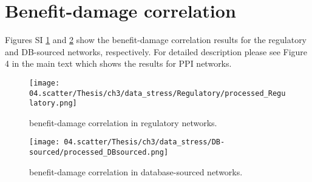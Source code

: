 

\newpage
\section{Benefit-damage correlation}\label{sup_extra_BD_corr}
    Figures SI \ref{fig_data_stress_Regulatory} and \ref{fig_data_stress_DBs} show the benefit-damage correlation results for the regulatory and DB-sourced networks, respectively. For detailed description please see Figure 4 in the main text which shows the results for PPI networks.

    \begin{figure}[H]%
        \texttt{[image: 04.scatter/Thesis/ch3/data\_stress/Regulatory/processed\_Regulatory.png]}
        \caption
                {
                    benefit-damage correlation in regulatory networks.
                }
        \label{fig_data_stress_Regulatory}
    \end{figure}

    \begin{figure}[H]%
                \texttt{[image: 04.scatter/Thesis/ch3/data\_stress/DB-sourced/processed\_DBsourced.png]}
                \caption
                        {
                            benefit-damage correlation in database-sourced networks.
                        }
                \label{fig_data_stress_DBs}
            \end{figure}
\printbibliography

